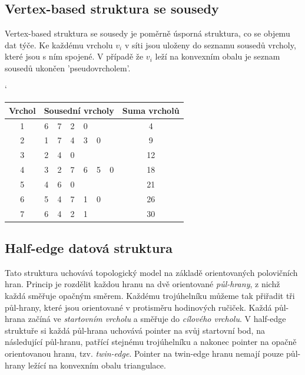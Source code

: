 \documentclass[12pt,a4paper]{article}
\begin{document}
\subsection{Vertex-based struktura se sousedy}

Vertex-based struktura se sousedy je poměrně úsporná struktura, co se objemu dat týče. Ke každému vrcholu $v_i$ v síti jsou uloženy do seznamu sousedů vrcholy, které jsou s ním spojené. V případě že $v_i$ leží na konvexním obalu je seznam sousedů ukončen 'pseudovrcholem'. 

\begin{table}[h]
\catcode`
\begin{tabular}{|c||c|c|c|c|c|c||c|}
\hline
Vrchol & \multicolumn{6}{|c|}{Sousední vrcholy} & Suma vrcholů \\ \hline \hline
1      & 6    & 7    & 2    & 0    &     &     & 4            \\ \hline
2      & 1    & 7    & 4    & 3    & 0   &     & 9            \\ \hline
3      & 2    & 4    & 0    &      &     &     & 12           \\ \hline
4      & 3    & 2    & 7    & 6    & 5   & 0   & 18           \\ \hline
5      & 4    & 6    & 0    &      &     &     & 21           \\ \hline
6      & 5    & 4    & 7    & 1    & 0   &     & 26           \\ \hline
7      & 6    & 4    & 2    & 1    &     &     & 30           \\ \hline
\end{tabular}
\end{table}

\newpage
\subsection{Half-edge datová struktura}

Tato struktura uchovává topologický model na základě orientovaných polovičních hran. Princip je rozdělit každou hranu na dvě orientované \textit{půl-hrany}, z nichž každá směřuje opačným směrem. Každému trojúhelníku můžeme tak přiřadit tři půl-hrany, které jsou orientované v protisměru hodinových ručiček. Každá půl-hrana začíná ve \textit{startovním vrcholu} a směřuje do \textit{cílového vrcholu}. V half-edge struktuře si každá půl-hrana uchovává pointer na svůj startovní bod, na následující půl-hranu, patřící stejnému trojúhelníku a nakonec pointer na opačně orientovanou hranu, tzv. \textit{twin-edge}. Pointer na twin-edge hranu nemají pouze půl-hrany ležící na konvexním obalu triangulace.
\end{document}
